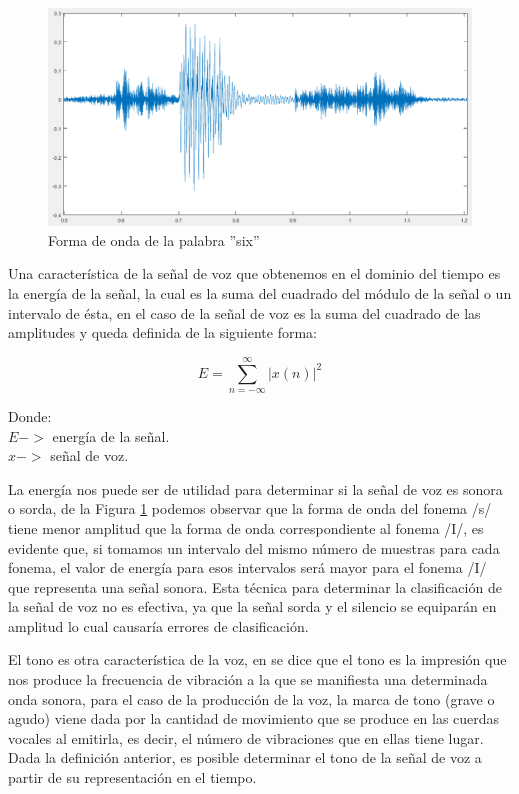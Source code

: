 \begin{figure}[H]
	\centering
	\includegraphics[width=1\linewidth]{figures/sixOnda}
	\caption{Forma de onda de la palabra ''six''}
	\label{fig:sixOnda}
\end{figure}

Una característica de la señal de voz que obtenemos en el dominio del tiempo es la energía de la señal, la cual es la suma del cuadrado del módulo de la señal o un intervalo de ésta, en el caso de la señal de voz es la suma del cuadrado de las amplitudes y queda definida de la siguiente forma:
		
\begin{equation}\label{eq:energia}
	E = \sum_{n=-\infty}^{\infty}{|x(n)|^2}
\end{equation}		

Donde:
\\$E->$ energía de la señal.
\\$x->$ señal de voz.


La energía nos puede ser de utilidad para determinar si la señal de voz es sonora o sorda, de la Figura \ref{fig:sixOnda} podemos observar que la forma de onda del fonema /s/ tiene menor amplitud que la forma de onda correspondiente al fonema /I/, es evidente que, si tomamos un intervalo del mismo número de muestras para cada fonema, el valor de energía para esos intervalos será mayor para el fonema /I/ que representa una señal sonora. Esta técnica para determinar la clasificación de la señal de voz no es efectiva, ya que la señal sorda y el silencio se equiparán en amplitud lo cual causaría errores de clasificación.

El tono es otra característica de la voz, en \cite{MediaRadio} se dice que el tono es la impresión que nos produce la frecuencia de vibración a la que se manifiesta una determinada onda sonora, para el caso de la producción de la voz, la marca de tono (grave o agudo) viene dada por la cantidad de movimiento que se produce en las cuerdas vocales al emitirla, es decir, el número de vibraciones que en ellas tiene lugar. Dada la definición anterior, es posible determinar el tono de la señal de voz a partir de su representación en el tiempo.

